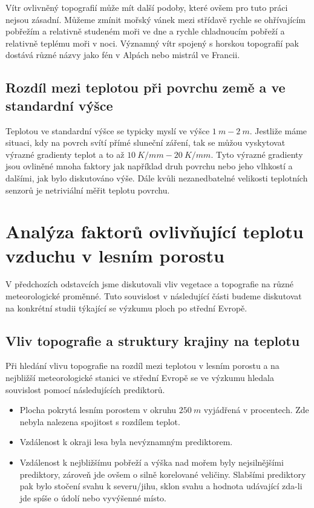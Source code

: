 Vítr ovlivněný topografií může mít další podoby, které ovšem pro tuto práci nejsou zásadní. Můžeme zmínit mořský vánek mezi střídavě rychle se ohřívajícím pobřežím a relativně studeném moři ve dne a rychle chladnoucím pobřeží a relativně teplému moři v noci. Významný vítr spojený s horskou topografií pak dostává různé názvy jako fén v Alpách nebo mistrál ve Francii\cite{alma}.

\subsection{Rozdíl mezi teplotou při povrchu země a ve standardní výšce}
Teplotou ve standardní výšce se typicky myslí ve výšce $\SI{1}{m}-\SI{2}{m}$. Jestliže máme situaci, kdy na povrch svítí přímé sluneční záření, tak se můžou vyskytovat výrazné gradienty teplot a to až $\SI{10}{K/mm}-\SI{20}{K/mm}$. Tyto výrazné gradienty jsou ovliněné mnoha faktory jak například druh povrchu nebo jeho vlhkostí a dalšími, jak bylo diskutováno výše. Dále kvůli nezanedbatelné velikosti teplotních senzorů je netriviální měřit teplotu povrchu\cite{arya2001}. 

\section{Analýza faktorů ovlivňující teplotu vzduchu v lesním porostu}
V předchozích odstavcích jsme diskutovali vliv vegetace a topografie na různé meteorologické proměnné. Tuto souvislost v následující části budeme diskutovat na konkrétní studii týkající se výzkumu ploch po střední Evropě.

\subsection{Vliv topografie a struktury krajiny na teplotu}
Při hledání vlivu topografie na rozdíl mezi teplotou v lesním porostu a na nejbližší meteorologické stanici ve střední Evropě se ve výzkumu \cite{ZellwegerFlorian2019Sdou} hledala souvislost pomocí následujících prediktorů.

\begin{itemize}
	\item Plocha pokrytá lesním porostem v okruhu $\SI{250}{m}$ vyjádřená v procentech. Zde nebyla nalezena spojitost s rozdílem teplot.
	\item Vzdálenost k okraji lesa byla nevýznamným prediktorem. 
	\item Vzdálenost k nejbližšímu pobřeží a výška nad mořem byly nejsilnějšími prediktory, zároveň jde ovšem o silně korelované veličiny. Slabšími prediktory pak bylo stočení svahu k severu/jihu, sklon svahu a hodnota udávající zda-li jde spíše o údolí nebo vyvýšenné místo.
\end{itemize}

